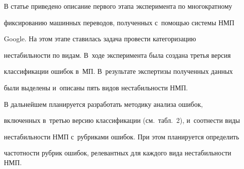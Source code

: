   В статье приведено описание первого этапа эксперимента по многократному 


фиксированию машинных переводов, полученных с~помощью системы НМП 


Google. На этом этапе ставилась задача провести категоризацию 


нестабильности по видам. В~ходе эксперимента была создана третья версия 


классификации ошибок в~МП. В~результате экспертизы полученных данных 


были выделены и~описаны пять видов нестабильности НМП.


  


  В дальнейшем планируется разработать методику анализа ошибок, 


включенных в~третью версию классификации (см.\ табл.~2), и~соотнести виды 


нестабильности НМП с~рубриками ошибок.  При этом планируется определить 


частотности рубрик ошибок, релевантных для каждого вида нестабильности НМП.





